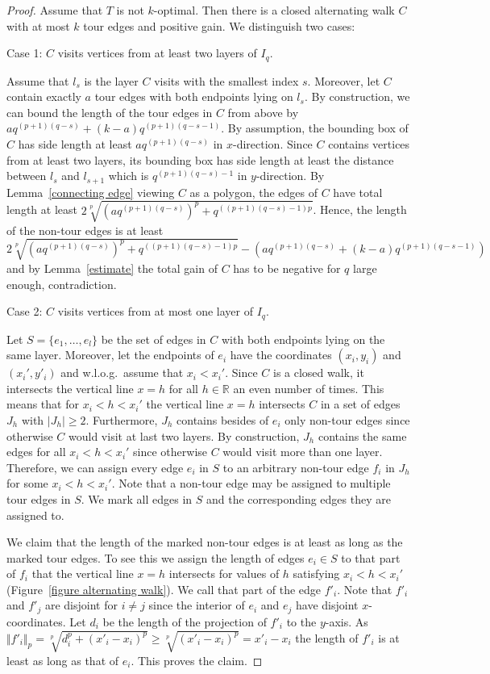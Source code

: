 \documentclass[a4paper, 11pt]{article}
\begin{document}
\begin{proof}
Assume that $T$ is not $k$-optimal. Then there is a closed alternating walk $C$ with at most $k$ tour edges and positive gain. We distinguish two cases: \medskip

\noindent Case 1: $C$ visits vertices from at least two layers of $I_q$.\medskip

Assume that $l_s$ is the layer $C$ visits with the smallest index $s$. Moreover, let $C$ contain exactly $a$ tour edges with both endpoints lying on $l_s$. By construction, we can bound the length of the tour edges in $C$ from above by $a q^{(p+1)(q-s)}+(k-a)q^{(p+1)(q-s-1)}$. By assumption, the bounding box of $C$ has side length at least $a q^{(p+1)(q-s)}$ in $x$-direction. Since $C$ contains vertices from at least two layers, its bounding box has side length at least the distance between $l_s$ and $l_{s+1}$ which is $q^{(p+1)(q-s)-1}$ in $y$-direction. By Lemma~\ref{connecting edge} viewing $C$ as a polygon, the edges of $C$ have total length at least $2\sqrt[p]{(a q^{(p+1)(q-s)})^p+q^{((p+1)(q-s)-1)p}}$. Hence, the length of the non-tour edges is at least $2\sqrt[p]{(a q^{(p+1)(q-s)})^p+q^{((p+1)(q-s)-1)p}}-(a q^{(p+1)(q-s)}+(k-a)q^{(p+1)(q-s-1)})$ and by Lemma~\ref{estimate} the total gain of $C$ has to be negative for $q$ large enough, contradiction. \medskip


\noindent Case 2: $C$ visits vertices from at most one layer  of $I_q$.\medskip

Let $S=\{e_1,\dots, e_l\}$ be the set of edges in $C$ with both endpoints lying on the same layer. Moreover, let the endpoints of $e_i$ have the coordinates $(x_i,y_i)$ and $(x_i',y'_i)$ and w.l.o.g.\ assume that $x_i<x_i'$. Since $C$ is a closed walk, it intersects the vertical line $x=h$ for all $h\in\mathbb{R}$ an even number of times. This means that for $x_i<h<x_i'$ the vertical line $x=h$ intersects $C$ in a set of edges $J_h$ with $\lvert J_h\rvert\geq 2$. Furthermore, $J_h$ contains besides of $e_i$ only non-tour edges since otherwise $C$ would visit at last two layers. By construction, $J_h$ contains the same edges for all $x_i<h<x_i'$ since otherwise $C$ would visit more than one layer. Therefore, we can assign every edge $e_i$ in $S$ to an arbitrary non-tour edge $f_i$ in $J_h$ for some $x_i<h<x_i'$. Note that a non-tour edge may be assigned to multiple tour edges in $S$. We mark all edges in $S$ and the corresponding edges they are assigned to.

We claim that the length of the marked non-tour edges is at least as long as the marked tour edges. To see this we assign the length of edges $e_i\in S$ to that part of $f_i$ that the vertical line $x=h$ intersects for values of $h$ satisfying $x_i<h<x_i'$ (Figure~\ref{figure alternating walk}). We call that part of the edge $f'_i$. Note that $f'_i$ and $f'_j$ are disjoint for $i\neq j$ since the interior of $e_i$ and $e_j$ have disjoint $x$-coordinates. Let $d_i$ be the length of the projection of $f'_i$ to the $y$-axis. As $\Vert f'_i\Vert_p = \sqrt[p]{d_i^p+(x'_i-x_i)^p}\geq \sqrt[p]{(x'_i-x_i)^p}=x'_i-x_i$ the length of $f'_i$ is at least as long as that of $e_i$. This proves the claim.


\end{proof}
\end{document}
